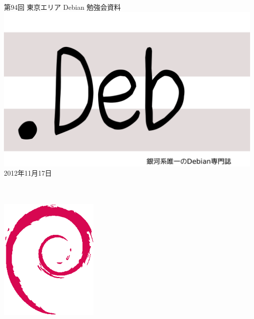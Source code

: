 \documentclass[mingoth,a4paper]{jsarticle}
\newcommand{\debmtgyear}{2012}
\newcommand{\debmtgmonth}{11}
\newcommand{\debmtgdate}{17}
\newcommand{\debmtgnumber}{94}
\begin{document}
\begin{titlepage}
\thispagestyle{empty}

\vspace*{-2cm}
第\debmtgnumber{}回 東京エリア Debian 勉強会資料\\
\hspace*{-2cm}
\includegraphics{image2012-natsu/dotdeb.pdf}\\
\hfill{}\debmtgyear{}年\debmtgmonth{}月\debmtgdate{}日

\\
\\

\vspace*{-2cm}
\hfill{}\includegraphics[height=6cm]{image200502/openlogo-nd.eps}
\end{titlepage}

\end{document}
